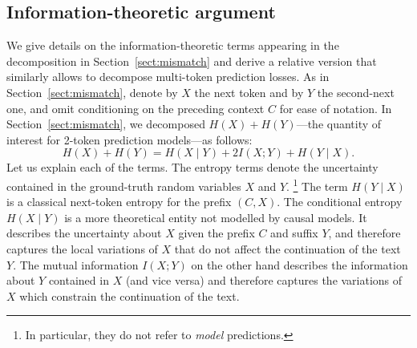 \subsection{Information-theoretic argument}
\label{app:loss-dec}
We give details on the information-theoretic terms appearing in the decomposition in Section~\ref{sect:mismatch} and derive a relative version that similarly allows to decompose multi-token prediction losses. As in Section~\ref{sect:mismatch}, denote by $X$ the next token and by $Y$ the second-next one, and omit conditioning on the preceding context $C$ for ease of notation. In Section~\ref{sect:mismatch}, we decomposed $H(X) + H(Y)$---the quantity of interest for 2-token prediction models---as follows:
\begin{equation} \label{eq:entr-dec}
  H(X) + H(Y) = H(X \mid Y) + 2 I(X; Y) + H(Y \mid X).
\end{equation}
Let us explain each of the terms. The entropy terms denote the uncertainty contained in the ground-truth random variables $X$ and $Y$. \footnote{In particular, they do not refer to \emph{model} predictions.} The term $H(Y \mid X)$ is a classical next-token entropy for the prefix $(C, X)$. The conditional entropy $H(X \mid Y)$ is a more theoretical entity not modelled by causal models. It describes the uncertainty about $X$ given the prefix $C$ and suffix $Y$, and therefore captures the local variations of $X$ that do not affect the continuation of the text $Y$. The mutual information $I(X;Y)$ on the other hand describes the information about $Y$ contained in $X$ (and vice versa) and therefore captures the variations of $X$ which constrain the continuation of the text.

